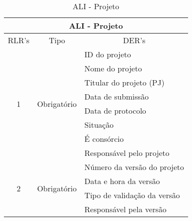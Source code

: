 \begin{table}[]
\centering
\caption{ALI - Projeto}
\label{ali_projeto}
\begin{tabular}{|c|c|l|}
\hline
\multicolumn{3}{|c|}{\textbf{ALI - Projeto}}                                                      \\ \hline
\multicolumn{1}{|l|}{RLR's} & Tipo                         & \multicolumn{1}{c|}{DER's}  \\ \hline
\multirow{8}{*}{1}          & \multirow{8}{*}{Obrigatório} & ID do projeto               \\ \cline{3-3} 
                            &                              & Nome do projeto             \\ \cline{3-3} 
                            &                              & Titular do projeto (PJ)     \\ \cline{3-3} 
                            &                              & Data de submissão           \\ \cline{3-3} 
                            &                              & Data de protocolo           \\ \cline{3-3} 
                            &                              & Situação                    \\ \cline{3-3} 
                            &                              & É consórcio                 \\ \cline{3-3} 
                            &                              & Responsável pelo projeto    \\ \hline
\multirow{4}{*}{2}        & \multirow{4}{*}{Obrigatório} & Número da versão do projeto \\ \cline{3-3} 
                            &                              & Data e hora da versão       \\ \cline{3-3} 
                            &                              & Tipo de validação da versão \\ \cline{3-3} 
                            &                              & Responsável pela versão     \\ \hline
\end{tabular}
\end{table}


